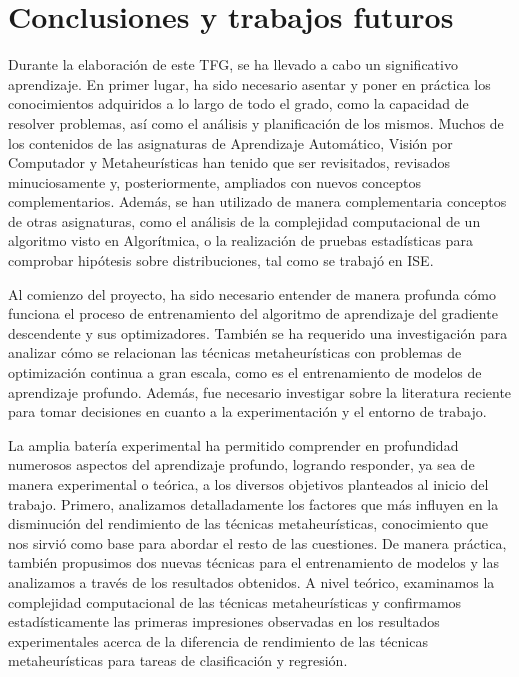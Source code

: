 \section{Conclusiones y trabajos futuros}

Durante la elaboración de este TFG, se ha llevado a cabo un significativo aprendizaje. En primer lugar, ha sido necesario asentar y poner en práctica los conocimientos adquiridos a lo largo de todo el grado, como la capacidad de resolver problemas, así como el análisis y planificación de los mismos. Muchos de los contenidos de las asignaturas de Aprendizaje Automático, Visión por Computador y Metaheurísticas han tenido que ser revisitados, revisados minuciosamente y, posteriormente, ampliados con nuevos conceptos complementarios. Además, se han utilizado de manera complementaria conceptos de otras asignaturas, como el análisis de la complejidad computacional de un algoritmo visto en Algorítmica, o la realización de pruebas estadísticas para comprobar hipótesis sobre distribuciones, tal como se trabajó en ISE.

Al comienzo del proyecto, ha sido necesario entender de manera profunda cómo funciona el proceso de entrenamiento del algoritmo de aprendizaje del gradiente descendente y sus optimizadores. También se ha requerido una investigación para analizar cómo se relacionan las técnicas metaheurísticas con problemas de optimización continua a gran escala, como es el entrenamiento de modelos de aprendizaje profundo. Además, fue necesario investigar sobre la literatura reciente para tomar decisiones en cuanto a la experimentación y el entorno de trabajo.

La amplia batería experimental ha permitido comprender en profundidad numerosos aspectos del aprendizaje profundo, logrando responder, ya sea de manera experimental o teórica, a los diversos objetivos planteados al inicio del trabajo. Primero, analizamos detalladamente los factores que más influyen en la disminución del rendimiento de las técnicas metaheurísticas, conocimiento que nos sirvió como base para abordar el resto de las cuestiones. De manera práctica, también propusimos dos nuevas técnicas para el entrenamiento de modelos y las analizamos a través de los resultados obtenidos. A nivel teórico, examinamos la complejidad computacional de las técnicas metaheurísticas y confirmamos estadísticamente las primeras impresiones observadas en los resultados experimentales acerca de la diferencia de rendimiento de las técnicas metaheurísticas para tareas de clasificación y regresión.

